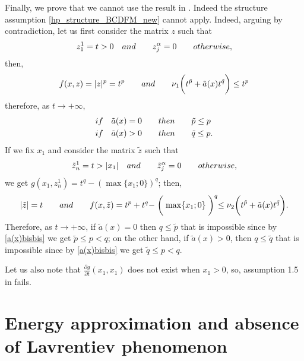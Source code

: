 \documentclass[a4paper,10pt]{article}
\theoremstyle{plain}
\theoremstyle{definition}
\numberwithin{equation}{section} \makeatletter
\begin{document}
\noindent Finally, we prove that we cannot use the result in \cite{BCDFM}.
Indeed the structure assumption \eqref{hp_structure_BCDFM_new} cannot apply. Indeed, arguing by contradiction, let us first consider the matrix $z$ such that
\[
z_1^1=t>0 \quad {\rm and } \qquad z_j^{\alpha}=0 \qquad {\rm otherwise,}
\]
then,
\[
f(x,z)=|z|^p=t^p \qquad {\rm and} \qquad \nu_1\bigg( t^{\tilde{p}}+ \tilde{a}(x)t^{\tilde{q}}\bigg) \le  t^p
\]
therefore, as $t \rightarrow +\infty$,
\begin{align}\label{a(x)bisbis}
{\rm if }\quad \tilde{a}(x)=0&  \qquad {\rm then}  \qquad \tilde{p} \le p\notag\\
{\rm if} \quad \tilde{a}(x)>0 & \qquad  {\rm then}  \qquad \tilde{q} \le p.
\end{align}
If we fix $x_1$ and consider the matrix $\tilde{z}$ such that
\[
\tilde{z}_n^1=t>|x_1| \quad {\rm and } \qquad \tilde{z}_j^{\alpha}=0 \qquad {\rm otherwise,}
\]
we get $g(x_1,z_n^1)=t^q-(\max \{x_1;0\})^q$; 
then, 
\[
|\tilde{z}|=t \qquad {\rm and} \qquad f(x, \tilde{z})= t^p+ t^q - \biggm(\max \{x_1;0\} \biggm)^q \le \nu_2\bigg( t^{\tilde{p}}+ \tilde{a}(x)t^{\tilde{q}}\bigg).
\]
Therefore, as $t \rightarrow +\infty$, if $\tilde{a}(x)=0$  then $ q \le \tilde{p}$ that is impossible since by \eqref{a(x)bisbis} we get $\tilde{p} \le p< q$; on the other hand, if $\tilde{a}(x)>0$, then $q \le \tilde{q}$ that is impossible since by \eqref{a(x)bisbis} we get $\tilde{q} \le p< q$.

\noindent
Let us also note that $\frac{\partial g}{\partial t}(x_1,x_1)$ does not exist when $x_1>0$, so, assumption 1.5 in \cite{HH} fails. 


\section{Energy approximation and absence of Lavrentiev phenomenon}
\label{en_approx_sec}
\end{document}
